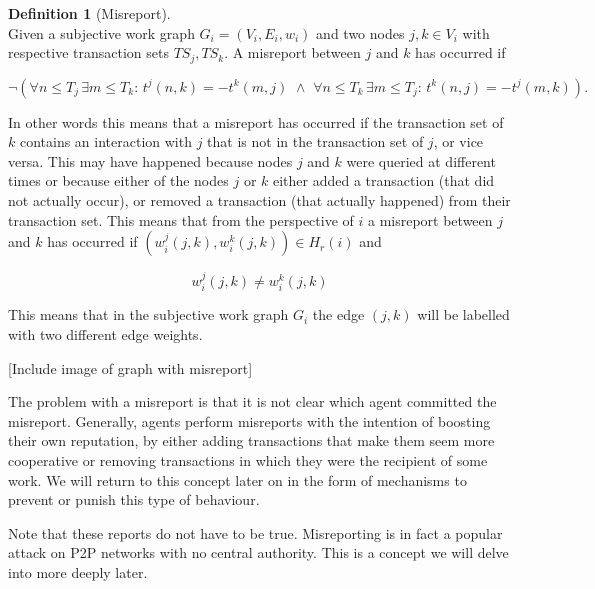 \documentclass[11pt,a4paper]{report}
\theoremstyle{definition}
\newtheorem{definition}{Definition}[section]
\theoremstyle{theorem}
\theoremstyle{proposition}
\theoremstyle{corollary}
\theoremstyle{lemma}
\theoremstyle{example}
\theoremstyle{remark}
\begin{document}
\begin{definition}[Misreport]\ \\
Given a subjective work graph $G_i=(V_i,E_i,w_i)$ and two nodes $j,k\in{}V_i$ with respective transaction sets $TS_j,TS_k$. A misreport between $j$ and $k$ has occurred if 

\[
\neg \left(\forall{} n\leq{}T_j\,\exists m\leq{}T_k:\,t^j(n,k)=-t^k(m,j)\,\,\wedge\,\,\forall{} n\leq{}T_k\,\exists m\leq{}T_j:\,t^k(n,j)=-t^j(m,k)\right).
\]

\noindent{}In other words this means that a misreport has occurred if the transaction set of $k$ contains an interaction with $j$ that is not in the transaction set of $j$, or vice versa. This may have happened because nodes $j$ and $k$ were queried at different times or because either of the nodes $j$ or $k$ either added a transaction (that did not actually occur), or removed a transaction (that actually happened) from their transaction set. This means that from the perspective of $i$ a misreport between $j$ and $k$ has occurred if $(w_i^j(j,k),w_i^k(j,k))\in{}H_r(i)$ and

\[
w_i^j(j,k)\neq{}w_i^k(j,k)
\] 

\noindent{}This means that in the subjective work graph $G_i$ the edge $(j,k)$ will be labelled with two different edge weights.
\begin{center}[Include image of graph with misreport] \vspace{1em}\\ \end{center}

\noindent{}The problem with a misreport is that it is not clear which agent committed the misreport. Generally, agents perform misreports with the intention of boosting their own reputation, by either adding transactions that make them seem more cooperative or removing transactions in which they were the recipient of some work. We will return to this concept later on in the form of mechanisms to prevent or punish this type of behaviour. \vspace{1em}\\
\end{definition}
\noindent{}Note that these reports do not have to be true. Misreporting is in fact a popular attack on P2P networks with no central authority. This is a concept we will delve into more deeply later. \vspace{1em}\\
\end{document}
